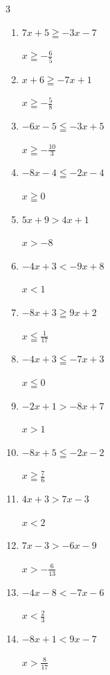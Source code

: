 \begin{multicols}{3}
\begin{enumerate}
  \item $7x+5\geqq -3x-7$

        $\displaystyle x\geqq -\frac{6}{5}$

\columnbreak %

  \item $x+6\geqq -7x+1$

        $\displaystyle x\geqq -\frac{5}{8}$

  \item $-6x-5\leqq -3x+5$

        $\displaystyle x\geqq -\frac{10}{3}$

  \item $-8x-4\leqq -2x-4$

        $\displaystyle x\geqq 0$

  \item $5x+9>4x+1$

        $\displaystyle x>-8$

  \item $-4x+3<-9x+8$

        $\displaystyle x<1$

  \item $-8x+3\geqq 9x+2$

        $\displaystyle x\leqq \frac{1}{17}$

  \item $-4x+3\leqq -7x+3$

        $\displaystyle x\leqq 0$

  \item $-2x+1>-8x+7$

        $\displaystyle x>1$

  \item $-8x+5\leqq -2x-2$

        $\displaystyle x\geqq \frac{7}{6}$

  \item $4x+3>7x-3$

        $\displaystyle x<2$

  \item $7x-3>-6x-9$

        $\displaystyle x>-\frac{6}{13}$

  \item $-4x-8<-7x-6$

        $\displaystyle x<\frac{2}{3}$

  \item $-8x+1<9x-7$

        $\displaystyle x>\frac{8}{17}$


\end{enumerate}
\end{multicols}
